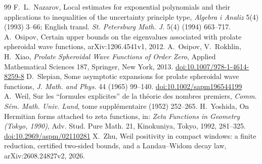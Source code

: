 \documentclass[11pt]{amsart}
\newcommand{\doi}[1]{\href{https://doi.org/#1}{doi:#1}}
\theoremstyle{remark}
\numberwithin{equation}{section}
\begin{document}
\begin{thebibliography}{99}
 F.~L.~Nazarov, Local estimates for exponential polynomials and their applications to inequalities of the uncertainty principle type, \emph{Algebra i Analiz} 5(4) (1993) 3--66; English transl. \emph{St. Petersburg Math. J.} 5(4) (1994) 663--717.
 A.~Osipov, Certain upper bounds on the eigenvalues associated with prolate spheroidal wave functions, arXiv:1206.4541v1, 2012.
 A.~Osipov, V.~Rokhlin, H.~Xiao, \emph{Prolate Spheroidal Wave Functions of Order Zero}, Applied Mathematical Sciences 187, Springer, New York, 2013. \doi{10.1007/978-1-4614-8259-8}
 D.~Slepian, Some asymptotic expansions for prolate spheroidal wave functions, \emph{J. Math. and Phys.} 44 (1965) 99--140. \doi{10.1002/sapm196544199}
 A.~Weil, Sur les ``formules explicites'' de la th\'eorie des nombres premiers, \emph{Comm. S\'em. Math. Univ. Lund}, tome suppl\'ementaire (1952) 252--265.
 H.~Yoshida, On Hermitian forms attached to zeta functions, in: \emph{Zeta Functions in Geometry (Tokyo, 1990)}, Adv. Stud. Pure Math. 21, Kinokuniya, Tokyo, 1992, 281--325. \doi{10.2969/aspm/02110281}
 X.~Zhu, Weil positivity in compact windows: a finite reduction, certified two-sided bounds, and a Landau--Widom decay law, arXiv:2608.24827v2, 2026.
\end{thebibliography}
\end{document}
